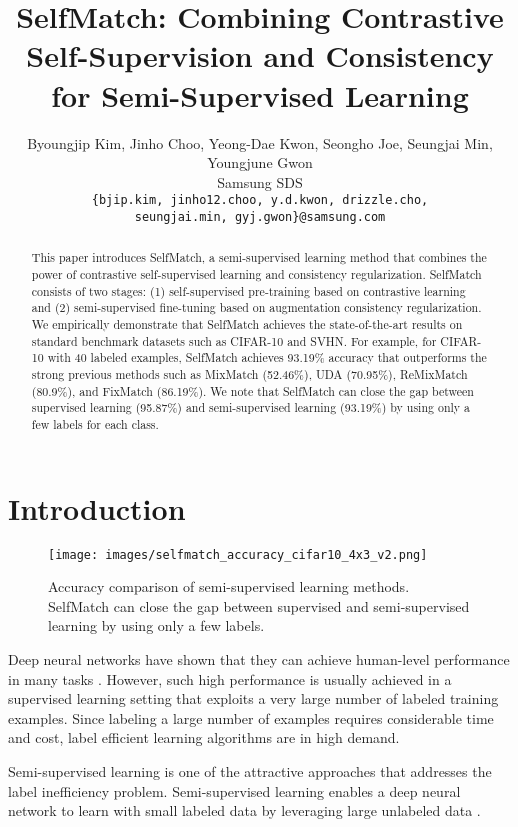 \documentclass{article}
\title{SelfMatch: Combining Contrastive Self-Supervision and Consistency for Semi-Supervised Learning}
\author{Byoungjip Kim, Jinho Choo, Yeong-Dae Kwon, Seongho Joe, Seungjai Min, Youngjune Gwon\\
  Samsung SDS \\
  \texttt{\{bjip.kim, jinho12.choo, y.d.kwon, drizzle.cho,} \\
  \texttt{seungjai.min, gyj.gwon\}@samsung.com} \\
}
\begin{document}
\maketitle

\begin{abstract}
This paper introduces SelfMatch, a semi-supervised learning method that combines the power of contrastive self-supervised learning and consistency regularization. SelfMatch consists of two stages: (1) self-supervised pre-training based on contrastive learning and (2) semi-supervised fine-tuning based on augmentation consistency regularization. We empirically demonstrate that SelfMatch achieves the state-of-the-art results on standard benchmark datasets such as CIFAR-10 and SVHN. For example, for CIFAR-10 with 40 labeled examples, SelfMatch achieves 93.19\% accuracy that outperforms the strong previous methods such as MixMatch (52.46\%), UDA (70.95\%), ReMixMatch (80.9\%), and FixMatch (86.19\%). We note that SelfMatch can close the gap between supervised learning (95.87\%) and semi-supervised learning (93.19\%) by using only a few labels for each class.  
\end{abstract}

\section{Introduction}
\label{section:introduction}

\begin{wrapfigure}{r}{0.4\textwidth}
  \centering
  \texttt{[image: images/selfmatch\_accuracy\_cifar10\_4x3\_v2.png]}
  \caption{Accuracy comparison of semi-supervised learning methods. SelfMatch can close the gap between supervised and semi-supervised learning by using only a few labels.}
  \label{fig:selfmatch-accuracy-cifar10}
\end{wrapfigure}

Deep neural networks have shown that they can achieve human-level performance in many tasks \cite{he2016deep}\cite{mask2017kaiming}. However, such high performance is usually achieved in a supervised learning setting that exploits a very large number of labeled training examples. Since labeling a large number of examples requires considerable time and cost, label efficient learning algorithms are in high demand.

Semi-supervised learning \cite{chapelle2006semi} is one of the attractive approaches that addresses the label inefficiency problem. Semi-supervised learning enables a deep neural network to learn with small labeled data by leveraging large unlabeled data \cite{lee2013pseudo}\cite{tarvainen2017mean}\cite{laine2016temporal}\cite{verma2019interpolation}\cite{berthelot2019mixmatch}\cite{xie2020unsupervised}\cite{berthelot2020remixmatch}\cite{sohn2020fixmatch}.
\end{document}
